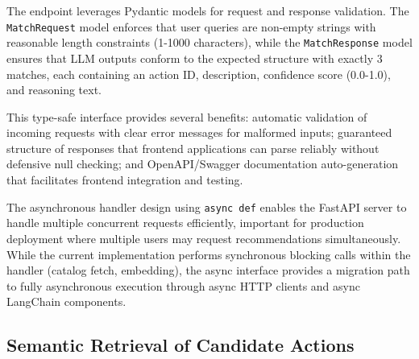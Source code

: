 %     
%     
%     
%     

The endpoint leverages Pydantic models for request and response validation. The \texttt{MatchRequest} model enforces that user queries are non-empty strings with reasonable length constraints (1-1000 characters), while the \texttt{MatchResponse} model ensures that LLM outputs conform to the expected structure with exactly 3 matches, each containing an action ID, description, confidence score (0.0-1.0), and reasoning text.

This type-safe interface provides several benefits: automatic validation of incoming requests with clear error messages for malformed inputs; guaranteed structure of responses that frontend applications can parse reliably without defensive null checking; and OpenAPI/Swagger documentation auto-generation that facilitates frontend integration and testing.

The asynchronous handler design using \texttt{async def} enables the FastAPI server to handle multiple concurrent requests efficiently, important for production deployment where multiple users may request recommendations simultaneously. While the current implementation performs synchronous blocking calls within the handler (catalog fetch, embedding), the async interface provides a migration path to fully asynchronous execution through async HTTP clients and async LangChain components.

\subsection{Semantic Retrieval of Candidate Actions}

